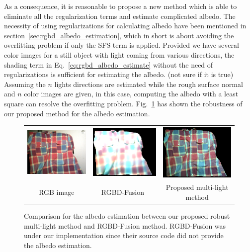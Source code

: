 As a consequence, it is reasonable to propose a new method which is able to eliminate all the regularization terms and estimate complicated albedo.
The necessity of using regularizations for calculating albedo have been mentioned in section~\ref{sec:rgbd_albedo_estimation}, which in short is about avoiding the overfitting problem if only the SFS term is applied.
Provided we have several color images for a still object with light coming from various directions, the shading term in Eq.~\ref{eq:rgbd_albedo_estimate} without the need of regularizations is sufficient for estimating the albedo.
{\color{blue} (not sure if it is true) Assuming the $n$ lights directions are estimated while the rough surface normal and $n$ color images are given, in this case, computing the albedo with a least square can resolve the overfitting problem.}
Fig.~\ref{fig:robust_rho_illustrate} has shown the robustness of our proposed method for the albedo estimation.

\begin{figure}[!ht]
\centering
\setlength{\tabcolsep}{0.2em} %
 {\renewcommand{\arraystretch}{0.9}%
\begin{tabular}{c| c c}
   \includegraphics[height = 0.23\linewidth]{figures/methodology/robust_rgb_shirt.png}&
   \includegraphics[height = 0.23\linewidth]{figures/methodology/rgbd_rho_shirt.png} &
   \includegraphics[height = 0.23\linewidth]{figures/methodology/robust_rho_shirt.png} \\
   {RGB image} & {RGBD-Fusion~\cite{or2015rgbd}} & {Proposed multi-light method}\\
 \end{tabular}}
\caption{Comparison for the albedo estimation between our proposed robust multi-light method and RGBD-Fusion method. RGBD-Fusion was under our implementation since their source code did not provide the albedo estimation.}
\label{fig:robust_rho_illustrate}
\end{figure}

